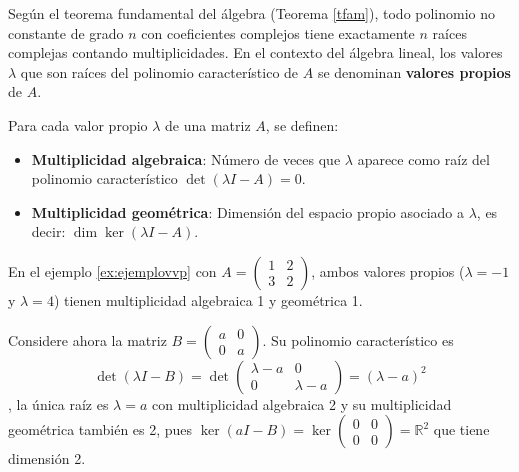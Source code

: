 Según el teorema fundamental del álgebra (Teorema \ref{tfam}), todo polinomio no constante de grado $n$ con coeficientes complejos tiene exactamente $n$ raíces complejas contando multiplicidades. En el contexto del álgebra lineal, los valores $\lambda$ que son raíces del polinomio característico de $A$ se denominan \textbf{valores propios} de $A$.

\begin{definition}\label{multiplicidadgeometrica}
Para cada valor propio $\lambda$ de una matriz $A$, se definen:
\begin{itemize}
    \item \textbf{Multiplicidad algebraica}: Número de veces que $\lambda$ aparece como raíz del polinomio característico $\det(\lambda I - A) = 0$.
    \item \textbf{Multiplicidad geométrica}: Dimensión del espacio propio asociado a $\lambda$, es decir: \(\dim \ker(\lambda I - A).\)
\end{itemize}
\end{definition}

\begin{rem}
En el ejemplo \ref{ex:ejemplovvp} con $A = \begin{pmatrix} 1 & 2 \\ 3 & 2 \end{pmatrix}$, ambos valores propios ($\lambda = -1$ y $\lambda = 4$) tienen multiplicidad algebraica 1 y geométrica 1. 

Considere ahora la matriz $B = \begin{pmatrix} a & 0 \\ 0 & a \end{pmatrix}$. Su polinomio característico es \[
\det(\lambda I - B) = \det\begin{pmatrix} \lambda - a & 0 \\ 0 & \lambda - a \end{pmatrix} = (\lambda - a)^2 \], la única raíz es $\lambda = a$ con multiplicidad algebraica 2 y su multiplicidad geométrica también es 2, pues \(
\ker(aI - B) = \ker\begin{pmatrix} 0 & 0 \\ 0 & 0 \end{pmatrix} = \mathbb{R}^2
\) que tiene dimensión 2.
\end{rem}


